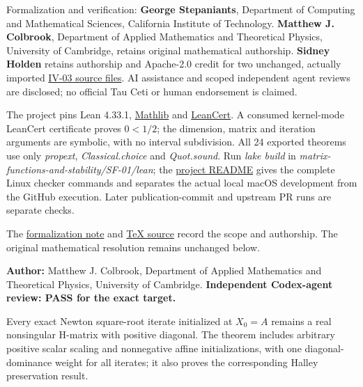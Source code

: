 \documentclass[11pt,a4paper]{article}
\makeatletter
\renewcommand{\subsection}{\Needspace{4\baselineskip}\@startsection{subsection}{2}{0pt}{9pt plus 1pt minus 1pt}{3pt}{\sffamily\bfseries\normalsize\color{ink}}}
\makeatother
\begin{document}
Formalization and verification: \textbf{George Stepaniants}, Department
of Computing and Mathematical Sciences, California Institute of
Technology. \textbf{Matthew J. Colbrook}, Department of Applied
Mathematics and Theoretical Physics, University of Cambridge, retains
original mathematical authorship. \textbf{Sidney Holden} retains
authorship and Apache-2.0 credit for two unchanged, actually imported
\href{https://github.com/ajt60gaibb/OpenProblemsInNLA/blob/main/matrix-functions-and-stability/SF-01/lean/REUSE-IV03.md}{IV-03
source files}. AI assistance and scoped independent agent reviews are
disclosed; no official Tau Ceti or human endorsement is claimed.

The project pins Lean 4.33.1,
\href{https://github.com/leanprover-community/mathlib4/tree/0df444a360eaa60ab8c11dca51a86af692955474}{Mathlib}
and
\href{https://github.com/alerad/leancert/tree/621a43d7cf21f87872392a01e874f2f1dbddc926}{LeanCert}.
A consumed kernel-mode LeanCert certificate proves \(0< 1/2\); the
dimension, matrix and iteration arguments are symbolic, with no interval
subdivision. All 24 exported theorems use only \textit{propext},
\textit{Classical.choice} and \textit{Quot.sound}. Run
\textit{lake build} in
\textit{matrix-functions-and-stability/SF-01/lean}; the
\href{https://github.com/ajt60gaibb/OpenProblemsInNLA/blob/main/matrix-functions-and-stability/SF-01/lean/README.md}{project
README} gives the complete Linux checker commands and separates the
actual local macOS development from the GitHub execution. Later
publication-commit and upstream PR runs are separate checks.

The
\href{https://github.com/ajt60gaibb/OpenProblemsInNLA/blob/main/matrix-functions-and-stability/SF-01/solution.pdf}{formalization
note} and
\href{https://github.com/ajt60gaibb/OpenProblemsInNLA/blob/main/matrix-functions-and-stability/SF-01/solution.tex}{TeX
source} record the scope and authorship. The original mathematical
resolution remains unchanged below.

\subsection{Resolution --- 2026-09-11}\label{resolution-2026-09-11}

\textbf{Author:} Matthew J. Colbrook, Department of Applied Mathematics
and Theoretical Physics, University of Cambridge. \textbf{Independent
Codex-agent review: PASS for the exact target.}

Every exact Newton square-root iterate initialized at \(X_0=A\) remains
a real nonsingular H-matrix with positive diagonal. The theorem includes
arbitrary positive scalar scaling and nonnegative affine
initializations, with one diagonal-dominance weight for all iterates; it
also proves the corresponding Halley preservation result.
\end{document}

